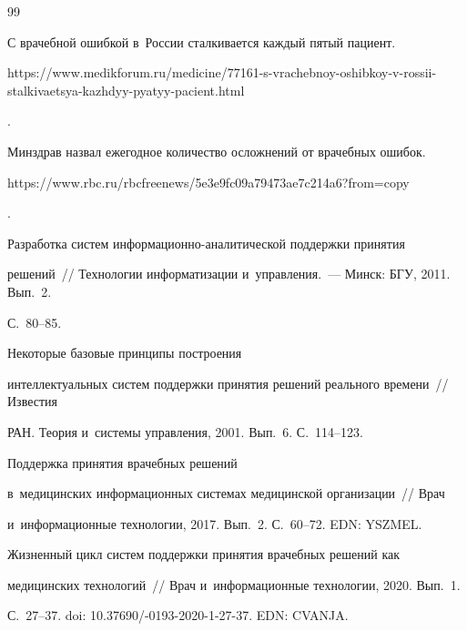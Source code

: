   

{\small\frenchspacing

{%


\begin{thebibliography}{99}


С врачебной ошибкой в~России сталкивается каждый пятый пациент. {\sf 

https://www.medikforum.ru/medicine/77161-s-vrachebnoy-oshibkoy-v-rossii-stalkivaetsya-kazhdyy-pyatyy-pacient.html}.


Минздрав назвал ежегодное количество осложнений от врачебных ошибок. {\sf 

https://www.rbc.ru/rbcfreenews/5e3e9fc09a79473ae7c214a6?from=copy}.


 Разработка систем информационно-аналитической поддержки принятия 

решений~/\!\!/ Технологии информатизации и~управления.~--- Минск: БГУ, 2011. Вып.~2. 

С.~80--85. 


 Некоторые базовые принципы построения 

интеллектуальных систем поддержки принятия решений реального времени~/\!\!/ Известия 

РАН. Теория и~сис\-те\-мы управ\-ле\-ния, 2001. Вып.~6. С.~114--123.


    Поддержка принятия врачебных решений 

   в~медицинских информационных системах медицинской организации~/\!\!/ Врач 

   и~информационные технологии, 2017. Вып.~2. С.~60--72. EDN: YSZMEL.


 Жизненный цикл систем поддержки принятия врачебных решений как 

медицинских технологий~/\!\!/ Врач и~информационные технологии, 2020. Вып.~1.  

С.~27--37. doi: 10.37690\!/-0193-2020-1-27-37. EDN: CVANJA.



\end{thebibliography}}}
